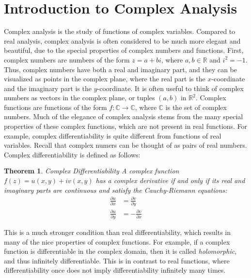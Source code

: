 \documentclass[12pt,letterpaper]{article}
\newtheorem{theorem}{Theorem}
\begin{document}
\section{Introduction to Complex Analysis}
Complex analysis is the study of functions of complex variables.
Compared to real analysis, complex analysis is often considered to be much more elegant and beautiful, due to the special properties of complex numbers and functions.
First, complex numbers are numbers of the form $z = a + bi$, where $a, b \in \mathbb{R}$ and $i^2 = -1$. \cite{WeissteinComplexNumber}
Thus, complex numbers have both a real and imaginary part, and they can be visualized as points in the complex plane, where the real part is the $x$-coordinate and the imaginary part is the $y$-coordinate.
It is often useful to think of complex numbers as vectors in the complex plane, or tuples $(a, b)$ in $\mathbb{R}^2$.
Complex functions are functions of the form $f: \mathbb{C} \to \mathbb{C}$, where $\mathbb{C}$ is the set of complex numbers.
Much of the elegance of complex analysis stems from the many special properties of these complex functions, which are not present in real functions.
For example, complex differentiability is quite different from functions of real variables.
Recall that complex numers can be thought of as pairs of real numbers.
Complex differentiability is defined as follows:

\begin{theorem}{Complex Differentiability}
    A complex function $f(z) = u(x, y) + iv(x, y)$ has a complex derivative if and only if its real and imaginary parts are continuous and satisfy the Cauchy-Riemann equations:
    \begin{align*}
        \frac{\partial u}{\partial x} &= \frac{\partial v}{\partial y} \\
        \frac{\partial u}{\partial y} &= -\frac{\partial v}{\partial x}
    \end{align*}
\end{theorem}

This is a much stronger condition than real differentiability, which results in many of the nice properties of complex functions.
For example, if a complex function is differentiable in the complex domain, then it is called \textit{holomorphic}, and thus infinitely differentiable. \cite{LangComplexAnalysis1998}
This is in contrast to real functions, where differentiability once does not imply differentiability infinitely many times.
\end{document}

